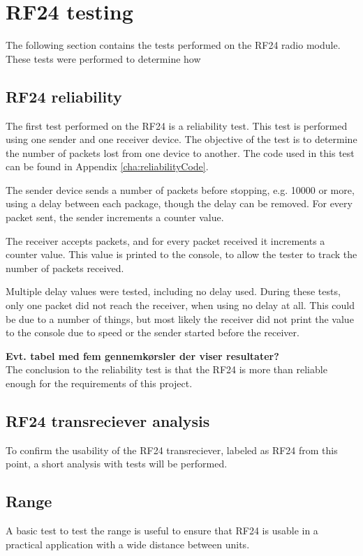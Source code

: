 \section{RF24 testing}
The following section contains the tests performed on the RF24 radio module. These tests were performed to determine how 

\subsection{RF24 reliability}
The first test performed on the RF24 is a reliability test. This test is performed using one sender and one receiver device. The objective of the test is to determine the number of packets lost from one device to another. 
The code used in this test can be found in Appendix \ref{cha:reliabilityCode}.


The sender device sends a number of packets before stopping, e.g. 10000 or more, using a delay between each package, though the delay can be removed. For every packet sent, the sender increments a counter value.

The receiver accepts packets, and for every packet received it increments a counter value. This value is printed to the console, to allow the tester to track the number of packets received.

Multiple delay values were tested, including no delay used. During these tests, only one packet did not reach the receiver, when using no delay at all. This could be due to a number of things, but most likely the receiver did not print the value to the console due to speed or the sender started before the receiver.

\textbf{Evt. tabel med fem gennemkørsler der viser resultater?} \\

The conclusion to the reliability test is that the RF24 is more than reliable enough for the requirements of this project.


\subsection{RF24 transreciever analysis}
To confirm the usability of the RF24 transreciever, labeled as RF24 from this point, a short analysis with tests will be performed.

\subsection{Range}
A basic test to test the range is useful to ensure that RF24 is usable in a practical application with a wide distance between units.

